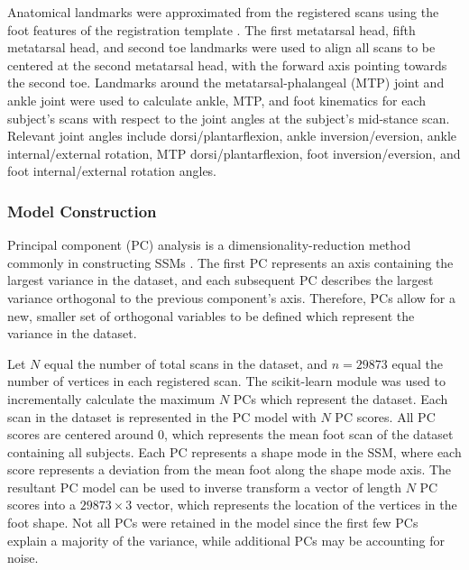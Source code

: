 \documentclass[defaultstyle,11pt]{comps}
\begin{document}
Anatomical landmarks were approximated from the registered scans using the foot features of the registration template \citep{VandenHerrewegen2014b}.
The first metatarsal head, fifth metatarsal head, and second toe landmarks were used to align all scans to be centered at the second metatarsal head, with the forward axis pointing towards the second toe.
Landmarks around the metatarsal-phalangeal (MTP) joint and ankle joint were used to calculate ankle, MTP, and foot kinematics for each subject's scans with respect to the joint angles at the subject's mid-stance scan.
Relevant joint angles include dorsi/plantarflexion, ankle inversion/eversion, ankle internal/external rotation, MTP dorsi/plantarflexion, foot inversion/eversion, and foot internal/external rotation angles.

\hypertarget{model-construction}{%
\subsubsection{Model Construction}\label{model-construction}}

Principal component (PC) analysis is a dimensionality-reduction method commonly in constructing SSMs \citep{Reed2008, Park2015a, Conrad2019, Stankovic2020}.
The first PC represents an axis containing the largest variance in the dataset, and each subsequent PC describes the largest variance orthogonal to the previous component's axis.
Therefore, PCs allow for a new, smaller set of orthogonal variables to be defined which represent the variance in the dataset.

Let \(N\) equal the number of total scans in the dataset, and \(n=29873\) equal the number of vertices in each registered scan. The scikit-learn module \citep{JMLR:v12:pedregosa11a} was used to incrementally calculate the maximum \(N\) PCs which represent the dataset.
Each scan in the dataset is represented in the PC model with \(N\) PC scores.
All PC scores are centered around 0, which represents the mean foot scan of the dataset containing all subjects.
Each PC represents a shape mode in the SSM, where each score represents a deviation from the mean foot along the shape mode axis. The resultant PC model can be used to inverse transform a vector of length \(N\) PC scores into a \(29873\times 3\) vector, which represents the location of the vertices in the foot shape. Not all PCs were retained in the model since the first few PCs explain a majority of the variance, while additional PCs may be accounting for noise.
\end{document}
